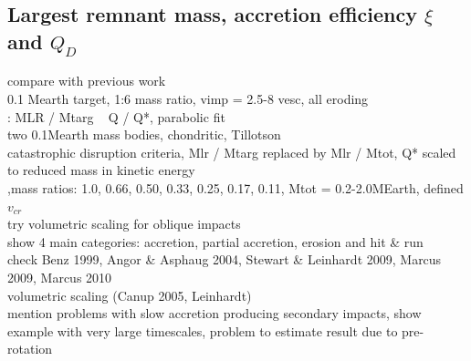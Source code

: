 \subsection{Largest remnant mass, accretion efficiency $\xi$ and $Q_D$}
compare with previous work\\
\cite{Benz:1988p3336} 0.1 Mearth target, 1:6 mass ratio, vimp = 2.5-8 vesc, all eroding\\
\cite{Benz1999Icar..142....5B}: MLR / Mtarg ~ Q / Q*, parabolic fit \\
\cite{Agnor:2004p3329}  two 0.1Mearth mass bodies, chondritic, Tillotson \\
\cite{Stewart:2009p3265} catastrophic disruption criteria, Mlr / Mtarg replaced by Mlr / Mtot, Q* scaled to reduced mass in kinetic energy \\ 
\cite{2010ApJ...714L..21K} ,mass ratios: 1.0, 0.66, 0.50, 0.33, 0.25, 0.17, 0.11, Mtot = 0.2-2.0MEarth, defined $v_{cr}$ \\
try volumetric scaling for oblique impacts \\
show 4 main categories: accretion, partial accretion, erosion and hit \& run \\
check Benz 1999, Angor \& Asphaug 2004, Stewart \& Leinhardt 2009, Marcus 2009, Marcus 2010 \\
volumetric scaling (Canup 2005, Leinhardt) \\
mention problems with slow accretion producing secondary impacts, show example with very large timescales, problem to estimate result due to pre-rotation\\

